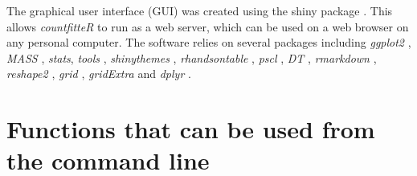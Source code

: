 The graphical user interface  (GUI) was created using  the shiny package \citep{shiny}. This allows \emph{countfitteR} to run as a web server, which can be used on a web browser on any personal computer. The software relies on several packages including \emph{ggplot2} \citep{ggplot2}, \emph{MASS} \citep{MASS}, \emph{stats}, \emph{tools} \citep{Rrr}, \emph{shinythemes} \citep{shinythemes}, \emph{rhandsontable} \citep{rhandsontable}, \emph{pscl} \citep{pscl}, \emph{DT} \citep{DT}, \emph{rmarkdown} \citep{rmarkdown}, \emph{reshape2} \citep{reshape2}, \emph{grid} \citep{Rrr}, \emph{gridExtra} \citep{gridextra} and \emph{dplyr}  \citep{dplyr}.


% 

\section{Functions that can be used from the command line}


